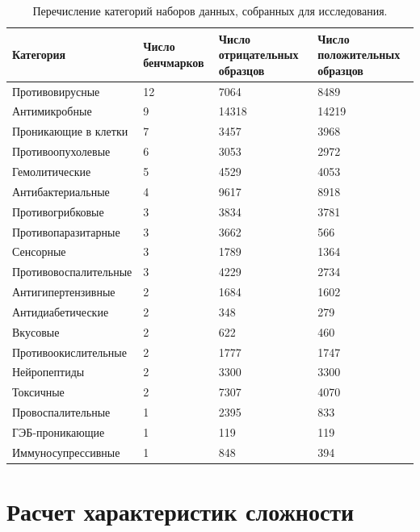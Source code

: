 \documentclass[specification,annotation,times]{itmo-student-thesis}
\begin{document}
\begin{table}[h]
\centering
\small
\begin{tabular}{|p{5cm}|p{3cm}|p{3cm}|p{3cm}|}
\hline
\textbf{Категория}  & \textbf{Число \newline бенчмарков} & \textbf{Число \newline отрицательных \newline образцов} & \textbf{Число \newline положительных \newline образцов} \\ \hline
Противовирусные & 12 & 7064 & 8489 \\ \hline
Антимикробные & 9 & 14318 & 14219 \\ \hline
Проникающие в клетки & 7 & 3457 & 3968 \\ \hline
Противоопухолевые & 6 & 3053 & 2972 \\ \hline
Гемолитические & 5 & 4529 & 4053 \\ \hline
Антибактериальные & 4 & 9617 & 8918 \\ \hline
Противогрибковые & 3 & 3834 & 3781 \\ \hline
Противопаразитарные & 3 & 3662 & 566 \\ \hline
Сенсорные & 3 & 1789 & 1364 \\ \hline
Противовоспалительные & 3 & 4229 & 2734 \\ \hline
Антигипертензивные & 2 & 1684 & 1602 \\ \hline
Антидиабетические & 2 & 348 & 279 \\ \hline
Вкусовые & 2 & 622 & 460 \\ \hline
Противоокислительные & 2 & 1777 & 1747 \\ \hline
Нейропептиды & 2 & 3300 & 3300 \\ \hline
Токсичные & 2 & 7307 & 4070 \\ \hline
Провоспалительные & 1 & 2395 & 833 \\ \hline
ГЭБ-проникающие & 1 & 119 & 119 \\ \hline
Иммуносупрессивные & 1 & 848 & 394 \\ \hline
\end{tabular}
\caption{Перечисление категорий наборов данных, собранных для исследования.}
\label{tab:dataset_categories}
\end{table}


\section{Расчет характеристик сложности}
\end{document}
